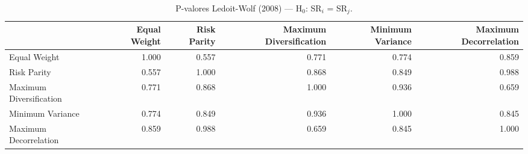 \begin{table}[htbp]
  \centering
  \caption{P-valores Ledoit-Wolf (2008) — H$_0$: SR$_i$ = SR$_j$.}
  \label{tab:lw_pvalues}
  \footnotesize
  \begin{tabular}{lrrrrr}
  \toprule
  & Equal Weight & Risk Parity & Maximum Diversification & Minimum Variance & Maximum Decorrelation \\
  \midrule
  Equal Weight & 1.000 & 0.557 & 0.771 & 0.774 & 0.859 \\
  Risk Parity & 0.557 & 1.000 & 0.868 & 0.849 & 0.988 \\
  Maximum Diversification & 0.771 & 0.868 & 1.000 & 0.936 & 0.659 \\
  Minimum Variance & 0.774 & 0.849 & 0.936 & 1.000 & 0.845 \\
  Maximum Decorrelation & 0.859 & 0.988 & 0.659 & 0.845 & 1.000 \\
  \bottomrule
  \end{tabular}
\end{table}